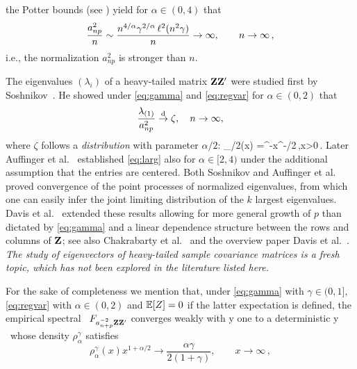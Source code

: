 the Potter bounds (see \cite[p.~25]{bingham:goldie:teugels:1987}) yield for $\alpha\in (0,4)$ that
\begin{equation}\label{eq:toinf}
 \frac{a_{np}^2}{n} \sim \frac{n^{4/\alpha} \gamma^{2/\alpha}\,\ell^2(n^2 \gamma)}{n} \to \infty, \qquad n \to \infty\,,
\end{equation}
i.e., the normalization $a_{np}^2$ is stronger than $n$.
\par
The eigenvalues $(\lambda_i)$ of a heavy-tailed matrix ${\mathbf Z}{\mathbf Z}'$ were 
studied first by Soshnikov~\cite{soshnikov:2004,soshnikov:2006}. He showed under 
\eqref{eq:gamma} and \eqref{eq:regvar} for $\alpha \in (0,2)$ that  
\begin{equation}\label{eq:larg}
\dfrac{\lambda_{(1)}}{a_{np}^2} \stackrel{\rm d}{\rightarrow} \zeta, \quad n \to \infty,
\end{equation}
where $\zeta$ follows a {\em \Frechet distribution} with parameter $\alpha/2$:
\beao
\Phi_{\alpha/2}(x) =\ex^{-x^{-\alpha/2}}\,,\qquad x>0\,.
\eeao
Later Auffinger et al.~\cite{auffinger:arous:peche:2009} established \eqref{eq:larg} also for $\alpha \in [2,4)$ 
under the additional assumption that the entries are centered. 
Both Soshnikov \cite{soshnikov:2004,soshnikov:2006}
and Auffinger et al.~\cite{auffinger:arous:peche:2009} proved convergence of the point processes of normalized eigenvalues, 
from which one can easily infer the joint limiting distribution of the $k$ largest eigenvalues.  
Davis et al.~\cite{davis:mikosch:pfaffel:2015,davis:pfaffel:stelzer:2014} 
extended these results allowing for more general growth of $p$ 
than dictated by \eqref{eq:gamma} and a linear dependence structure between the rows and columns of ${\mathbf Z}$; see also Chakrabarty et al.~\cite{chakrabarty:hazra:roy:20013} and the overview
paper Davis et al.~\cite{davis:mikosch:heiny:xie:2015}. {\em The study of eigenvectors of heavy-tailed sample covariance matrices is a fresh topic, which has not been explored in the literature listed here.}
\par
For the sake of completeness we mention 
that, under \eqref{eq:gamma} with $\gamma\in (0,1]$,  
\eqref{eq:regvar} with $\alpha\in (0,2)$ and $\mathbb{E}[Z]=0$ if the latter expectation is defined,
the empirical spectral \ds\ $F_{a_{n+p}^{-2}{\mathbf Z} {\mathbf Z}'}$ converges weakly with \pro y one to a deterministic 
\pro y \ms\ whose density $\rho_{\alpha}^\gamma$ satisfies
\begin{equation*}
\rho_{\alpha}^\gamma(x) x^{1+\alpha/2} \to \frac{\alpha \gamma}{2(1+\gamma)}, \qquad x \to \infty\,,
\end{equation*}
